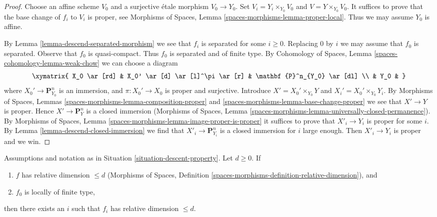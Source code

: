\begin{proof}
Choose an affine scheme $V_0$ and a surjective \'etale morphism $V_0 \to Y_0$.
Set $V_i = Y_i \times_{Y_0} V_0$ and $V = Y \times_{Y_0} V_0$.
It suffices to prove that the base change of $f_i$ to $V_i$ is
proper, see Morphisms of Spaces, Lemma
\ref{spaces-morphisms-lemma-proper-local}.
Thus we may assume $Y_0$ is affine.

\medskip\noindent
By Lemma \ref{lemma-descend-separated-morphism} we see that
$f_i$ is separated for some $i \geq 0$. Replacing
$0$ by $i$ we may assume that $f_0$ is separated.
Observe that $f_0$ is quasi-compact. Thus $f_0$ is separated and
of finite type. By
Cohomology of Spaces, Lemma \ref{spaces-cohomology-lemma-weak-chow}
we can choose a diagram
$$
\xymatrix{
X_0 \ar[rd] & X_0' \ar[d] \ar[l]^\pi \ar[r] & \mathbf{P}^n_{Y_0} \ar[dl] \\
& Y_0 &
}
$$
where $X_0' \to \mathbf{P}^n_{Y_0}$ is an immersion, and
$\pi : X_0' \to X_0$ is proper and surjective. Introduce
$X' = X_0' \times_{Y_0} Y$ and $X_i' = X_0' \times_{Y_0} Y_i$.
By Morphisms of Spaces, Lemmas
\ref{spaces-morphisms-lemma-composition-proper} and
\ref{spaces-morphisms-lemma-base-change-proper}
we see that $X' \to Y$ is proper. Hence $X' \to \mathbf{P}^n_Y$ is
a closed immersion (Morphisms of Spaces, Lemma
\ref{spaces-morphisms-lemma-universally-closed-permanence}). By
Morphisms of Spaces, Lemma \ref{spaces-morphisms-lemma-image-proper-is-proper}
it suffices to prove that $X'_i \to Y_i$ is proper for some $i$.
By Lemma \ref{lemma-descend-closed-immersion}
we find that $X'_i \to \mathbf{P}^n_{Y_i}$ is
a closed immersion for $i$ large enough. Then $X'_i \to Y_i$
is proper and we win.
\end{proof}

\begin{lemma}
\label{lemma-eventually-relative-dimension}
Assumptions and notation as in Situation \ref{situation-descent-property}.
Let $d \geq 0$. If
\begin{enumerate}
\item $f$ has relative dimension $\leq d$
(Morphisms of Spaces, Definition
\ref{spaces-morphisms-definition-relative-dimension}), and
\item $f_0$ is locally of finite type,
\end{enumerate}
then there exists an $i$ such that $f_i$ has relative dimension $\leq d$.
\end{lemma}


